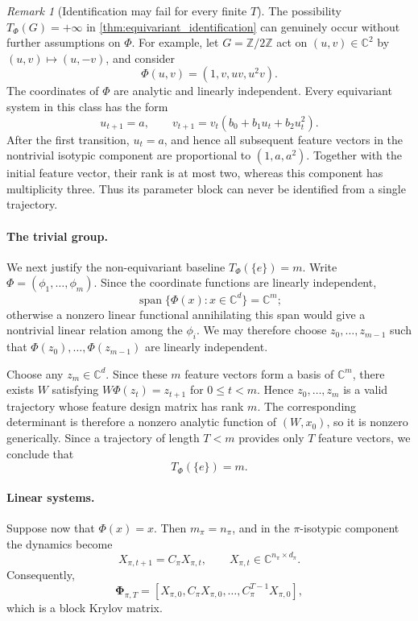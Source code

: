 \documentclass[11pt]{article}
\theoremstyle{plain}
\theoremstyle{definition}
\theoremstyle{remark}
\newtheorem{remark}[theorem]{Remark}
\begin{document}
\begin{remark}[Identification may fail for every finite \(T\)]
The possibility \(T_\Phi(G)=+\infty\) in
\cref{thm:equivariant_identification} can genuinely occur without further
assumptions on \(\Phi\). For example, let \(G=\mathbb Z/2\mathbb Z\) act on
\((u,v)\in\mathbb C^2\) by \((u,v)\mapsto(u,-v)\), and consider
\[
\Phi(u,v)=(1,v,uv,u^2v).
\]
The coordinates of \(\Phi\) are analytic and linearly independent. Every
equivariant system in this class has the form
\[
u_{t+1}=a,\qquad
v_{t+1}=v_t(b_0+b_1u_t+b_2u_t^2).
\]
After the first transition, \(u_t=a\), and hence all subsequent feature
vectors in the nontrivial isotypic component are proportional to
\((1,a,a^2)\). Together with the initial feature vector, their rank is at
most two, whereas this component has multiplicity three. Thus its parameter
block can never be identified from a single trajectory.
\end{remark}


\paragraph{The trivial group.}
We next justify the non-equivariant baseline \(T_\Phi(\{e\})=m\). Write
\(\Phi=(\phi_1,\ldots,\phi_m)\). Since the coordinate functions are linearly
independent,
\[
\operatorname{span}\{\Phi(x):x\in\mathbb C^d\}=\mathbb C^m;
\]
otherwise a nonzero linear functional annihilating this span would give a
nontrivial linear relation among the \(\phi_i\). We may therefore choose
\(z_0,\ldots,z_{m-1}\) such that
\(\Phi(z_0),\ldots,\Phi(z_{m-1})\) are linearly independent.

Choose any \(z_m\in\mathbb C^d\). Since these \(m\) feature vectors form a
basis of \(\mathbb C^m\), there exists \(W\) satisfying
\(W\Phi(z_t)=z_{t+1}\) for \(0\le t<m\). Hence
\(z_0,\ldots,z_m\) is a valid trajectory whose feature design matrix has rank
\(m\). The corresponding determinant is therefore a nonzero analytic
function of \((W,x_0)\), so it is nonzero generically. Since a trajectory of
length \(T<m\) provides only \(T\) feature vectors, we conclude that
\[
T_\Phi(\{e\})=m.
\]


\paragraph{Linear systems.}
Suppose now that \(\Phi(x)=x\). Then \(m_\pi=n_\pi\), and in the
\(\pi\)-isotypic component the dynamics become
\[
X_{\pi,t+1}=C_\pi X_{\pi,t},
\qquad
X_{\pi,t}\in\mathbb C^{n_\pi\times d_\pi}.
\]
Consequently,
\[
\mathbf{\Phi}_{\pi,T}
=
[X_{\pi,0},C_\pi X_{\pi,0},\ldots,C_\pi^{T-1}X_{\pi,0}],
\]
which is a block Krylov matrix.
\end{document}
